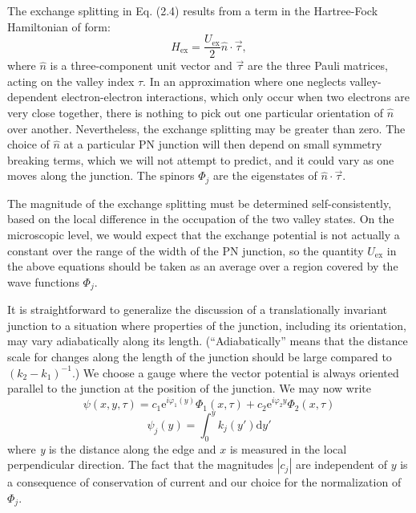\documentclass[%
reprint,amsmath,amssymb,aps,prl,superscriptaddress,
twocolumn
]{revtex4-1}
\begin{document}
		The exchange splitting in Eq. (2.4) results from a term in the Hartree-Fock Hamiltonian of form:
		\begin{equation}
		H_{\mathrm{ex}} = \frac{U_\mathrm{ex}}{2} \hat{n} \cdot \vec{\tau},
		\end{equation}
		where $\hat{n}$ is a three-component unit vector and $\vec{\tau}$ are the three Pauli matrices, acting on the valley index $\tau$. In an approximation where one neglects valley-dependent electron-electron interactions, which only occur when two electrons are very close together, there is nothing to pick out one particular orientation of $\hat{n}$ over another. Nevertheless, the exchange splitting may be greater than zero. The choice of $\hat{n}$ at a particular PN junction will then depend on small symmetry breaking terms, which we will not attempt to predict, and it could vary as one moves along the junction. The spinors $\varPhi_j$ are the eigenstates of $\hat{n} \cdot \vec{\tau}$.
		
		The magnitude of the exchange splitting must be determined self-consistently, based on the local difference in the occupation of the two valley states. On the microscopic level, we would expect that the exchange potential is not actually a constant over the range of the width of the PN junction, so the quantity $U_\mathrm{ex}$ in the above equations should be taken as an average over a region covered by the wave functions $\varPhi_j$.
		
		It is straightforward to generalize the discussion of a translationally invariant junction to a situation where properties of the junction, including its orientation, may vary adiabatically along its length. (“Adiabatically” means that the distance scale for changes along the length of the junction should be large compared to $(k_2-k_1)^{-1}$.) We choose a gauge where the vector potential is always oriented parallel to the junction at the position of the junction. We may now write
		\begin{equation}
		\psi (x,y,\tau) = c_1 \mathrm{e}^{i \varphi_1 (y)} \varPhi_1(x,\tau) + c_2 \mathrm{e}^{i \varphi_2 y} \varPhi_2(x,\tau)
		\end{equation}
		\begin{equation}
		\psi_j(y) = \int_0^y k_j(y')\mathrm{d}y'
		\end{equation}
		where \emph{y} is the distance along the edge and $x$ is measured in the local perpendicular direction. The fact that the magnitudes $|c_j|$ are independent of $y$ is a consequence of conservation of current and our choice for the normalization of $\varPhi_j$.\\
		
\end{document}
